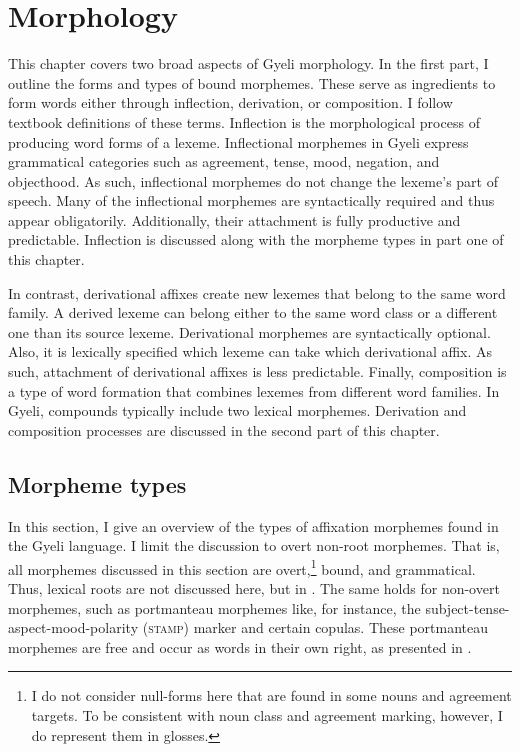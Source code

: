 \chapter{Morphology}
\label{sec:WordForm}

This chapter covers two broad aspects of Gyeli morphology. In the first part, I outline the  forms and types of bound morphemes. These serve as ingredients to form words either through inflection,  derivation, or composition. I follow  textbook definitions of these terms. Inflection is the morphological process of producing word forms of a lexeme. Inflectional morphemes in Gyeli express grammatical categories such as agreement, tense, mood, negation, and objecthood. As such, inflectional morphemes do not change the lexeme's part of speech. Many of the inflectional morphemes are  syntactically required and thus appear obligatorily. Additionally, their attachment is fully productive and predictable. Inflection is discussed along with the morpheme types in part one of this chapter.

In contrast, derivational affixes create new lexemes that belong to the same word family. A derived lexeme can belong either to the same word class or a different one than its source lexeme. Derivational morphemes are syntactically optional. Also, it is lexically specified which lexeme can take which derivational affix. As such, attachment of derivational affixes is less predictable. Finally, composition is a type of word formation that combines lexemes from different word families. In Gyeli, compounds typically include two lexical morphemes. Derivation and composition processes are discussed in the second part of this chapter.

\section{Morpheme types}
\label{sec:MorphType}

In this section, I give an overview of the types of affixation morphemes found in the Gyeli language. I limit the discussion to overt non-root morphemes. That is, all morphemes discussed in this section are overt,\footnote{I do not consider null-forms here that are found in some nouns and agreement targets. To be consistent with noun class and agreement marking, however, I do represent them in glosses.}  bound, and grammatical.  Thus, lexical roots are not discussed here, but in . The same holds for non-overt morphemes, such as portmanteau morphemes like, for instance, the subject-tense-aspect-mood-polarity (\textsc{stamp}) marker and certain copulas. These portmanteau morphemes are free and occur as words in their own right, as presented in . 

